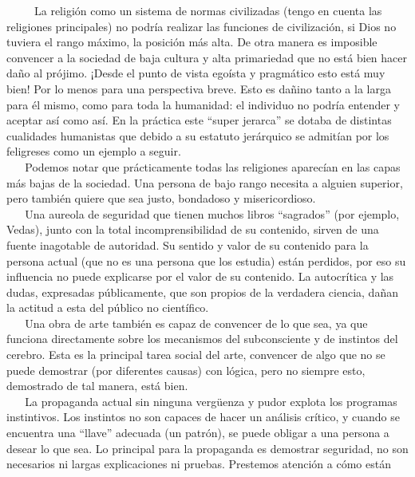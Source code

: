 ~ ~ ~ La religión como un sistema de normas civilizadas (tengo en cuenta
las religiones principales) no podría realizar las funciones de
civilización, si Dios no tuviera el rango máximo, la posición más alta.
De otra manera es imposible convencer a la sociedad de baja cultura y
alta primariedad que no está bien hacer daño al prójimo. ¡Desde el punto
de vista egoísta y pragmático esto está muy bien! Por lo menos para una
perspectiva breve. Esto es dañino tanto a la larga para él mismo, como
para toda la humanidad: el individuo no podría entender y aceptar así
como así. En la práctica este ``super jerarca'' se dotaba de distintas
cualidades humanistas que debido a su estatuto jerárquico se admitían
por los feligreses como un ejemplo a seguir.\\
\hspace*{0.333em} ~ ~ Podemos notar que prácticamente todas las
religiones aparecían en las capas más bajas de la sociedad. Una persona
de bajo rango necesita a alguien superior, pero también quiere que sea
justo, bondadoso y misericordioso.\\
\hspace*{0.333em} ~ ~ Una aureola de seguridad que tienen muchos libros
``sagrados'' (por ejemplo, Vedas), junto con la total incomprensibilidad
de su contenido, sirven de una fuente inagotable de autoridad. Su
sentido y valor de su contenido para la persona actual (que no es una
persona que los estudia) están perdidos, por eso su influencia no puede
explicarse por el valor de su contenido. La autocrítica y las dudas,
expresadas públicamente, que son propios de la verdadera ciencia, dañan
la actitud a esta del público no científico.\\
\hspace*{0.333em} ~ ~ Una obra de arte también es capaz de convencer de
lo que sea, ya que funciona directamente sobre los mecanismos del
subconsciente y de instintos del cerebro. Esta es la principal tarea
social del arte, convencer de algo que no se puede demostrar (por
diferentes causas) con lógica, pero no siempre esto, demostrado de tal
manera, está bien.\\
\hspace*{0.333em} ~ ~ La propaganda actual sin ninguna vergüenza y pudor
explota los programas instintivos. Los instintos no son capaces de hacer
un análisis crítico, y cuando se encuentra una ``llave'' adecuada (un
patrón), se puede obligar a una persona a desear lo que sea. Lo
principal para la propaganda es demostrar seguridad, no son necesarios
ni largas explicaciones ni pruebas. Prestemos atención a cómo están
